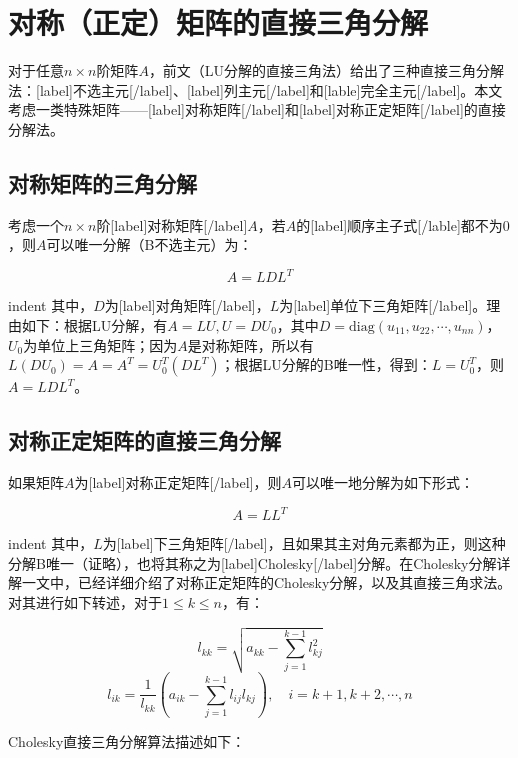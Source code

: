 \documentclass[UTF8,nofonts]{ctexart}
\begin{document}
\section*{对称（正定）矩阵的直接三角分解}

对于任意$n \times n$阶矩阵$A$，前文（LU分解的直接三角法）给出了三种直接三角分解法：[label]不选主元[/label]、[label]列主元[/label]和[lable]完全主元[/label]。本文考虑一类特殊矩阵——[label]对称矩阵[/label]和[label]对称正定矩阵[/label]的直接分解法。

\subsection*{对称矩阵的三角分解}

考虑一个$n \times n$阶[label]对称矩阵[/label]$A$，若$A$的[label]顺序主子式[/lable]都不为$0$，则$A$可以唯一分解（B不选主元）为：

\begin{equation}\label{eq:slu}A=LDL^T\end{equation}

indent 其中，$D$为[label]对角矩阵[/label]，$L$为[label]单位下三角矩阵[/label]。理由如下：根据LU分解，有$A=LU,U=DU_0$，其中$D=\text{diag}(u_{11},u_{22},\cdots,u_{nn})$，$U_0$为单位上三角矩阵；因为$A$是对称矩阵，所以有$L(DU_0)=A=A^T=U_0^T(DL^T)$；根据LU分解的B唯一性，得到：$L=U_0^T$，则$A=LDL^T$。

\subsection*{对称正定矩阵的直接三角分解}

如果矩阵$A$为[label]对称正定矩阵[/label]，则$A$可以唯一地分解为如下形式：

\begin{equation}\label{eq:splu}A=LL^T\end{equation}

indent 其中，$L$为[label]下三角矩阵[/label]，且如果其主对角元素都为正，则这种分解B唯一（证略），也将其称之为[label]Cholesky[/label]分解。在Cholesky分解详解一文中，已经详细介绍了对称正定矩阵的Cholesky分解，以及其直接三角求法。对其进行如下转述，对于$1 \leq k \leq n$，有：

\[
l_{kk}=\sqrt{a_{kk}-\sum_{j=1}^{k-1}l_{kj}^2}
\]
\[l_{ik}=\frac{1}{l_{kk}}\left(a_{ik}-\sum_{j=1}^{k-1}l_{ij}l_{kj}\right),\quad i=k+1,k+2,\cdots,n
\]

Cholesky直接三角分解算法描述如下：
\end{document}
